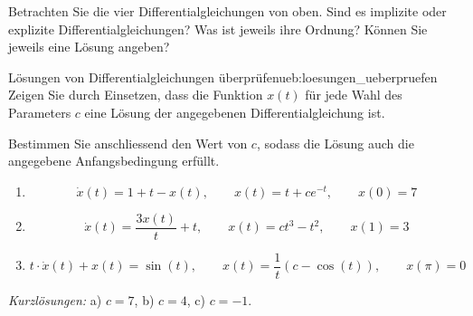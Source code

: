 Betrachten Sie die vier Differentialgleichungen von oben.
Sind es implizite oder explizite
Differentialgleichungen?
Was ist jeweils ihre Ordnung?
Können Sie jeweils eine Lösung angeben?


\begin{ueb}{Lösungen von Differentialgleichungen überprüfen}{ueb:loesungen_ueberpruefen}
    Zeigen Sie durch Einsetzen, dass die Funktion \(x(t)\) für jede
    Wahl des Parameters \(c\) eine Lösung der angegebenen
    Differentialgleichung ist.

    Bestimmen Sie anschliessend den Wert von \(c\), sodass die
    Lösung auch die angegebene Anfangsbedingung erfüllt.

    \begin{enumerate}
        \item
              \[
                  \dot{x}(t)=1+t-x(t), \qquad
                  x(t)=t+ce^{-t}, \qquad
                  x(0)=7
              \]

        \item
              \[
                  \dot{x}(t)=\frac{3x(t)}{t}+t, \qquad
                  x(t)=ct^3-t^2, \qquad
                  x(1)=3
              \]

        \item
              \[
                  t\cdot\dot{x}(t)+x(t)=\sin(t), \qquad
                  x(t)=\frac{1}{t}(c-\cos(t)), \qquad
                  x(\pi)=0
              \]
    \end{enumerate}
\end{ueb}


\textit{Kurzlösungen:} a) \(c=7\), b) \(c=4\), c) \(c=-1\).
